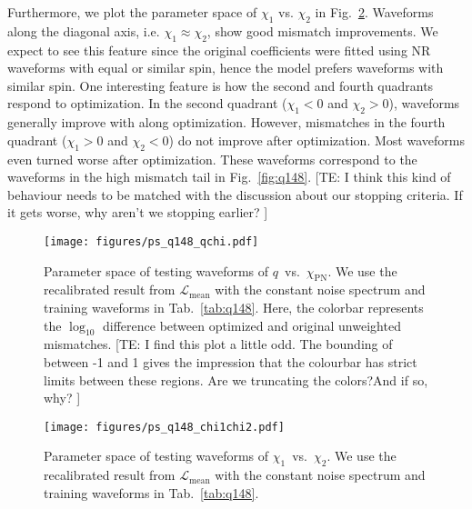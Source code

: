 \documentclass[twocolumn]{aastex631}
\newcommand{\te}[1]{{\color{rr}[TE: #1 ]}}
\begin{document}
Furthermore, we plot the parameter space of $\chi_1$ vs. $\chi_2$ in Fig.~\ref{fig:ps_q148}. Waveforms along the diagonal axis, i.e. $\chi_1\approx\chi_2$, show good mismatch improvements. We expect to see this feature since the original coefficients were fitted using NR waveforms with equal or similar spin, hence the model prefers waveforms with similar spin. One interesting feature is how the second and fourth quadrants respond to optimization. In the second quadrant ($\chi_1<0$ and $\chi_2>0$), waveforms generally improve with along optimization. However, mismatches in the fourth quadrant ($\chi_1>0$ and $\chi_2<0$) do not improve after optimization. Most waveforms even turned worse after optimization. These waveforms correspond to the waveforms in the high mismatch tail in Fig.~\ref{fig:q148}. \te{I think this kind of behaviour needs to be matched with the discussion about our stopping criteria. If it gets worse, why aren't we stopping earlier?}


\begin{figure}[t]
	\centering
	\texttt{[image: figures/ps\_q148\_qchi.pdf]}
	\caption{Parameter space of testing waveforms of $q$~vs.~$\chi_{\mathrm{PN}}$. We use the recalibrated result from $\mathcal{L}_{\mathrm{mean}}$ with the constant noise spectrum and training waveforms in Tab.~\ref{tab:q148}. Here, the colorbar represents the $\log_{10}$ difference between optimized and original unweighted mismatches. \te{I find this plot a little odd. The bounding of between -1 and 1 gives the impression that the colourbar has strict limits between these regions. Are we truncating the colors?And if so, why?}}
	\label{fig:ps_q148_qchi}
\end{figure}
\begin{figure}[t]
	\centering
	\texttt{[image: figures/ps\_q148\_chi1chi2.pdf]}
	\caption{Parameter space of testing waveforms of $\chi_1$~vs.~$\chi_2$. We use the recalibrated result from $\mathcal{L}_{\mathrm{mean}}$ with the constant noise spectrum and training waveforms in Tab.~\ref{tab:q148}.}
	\label{fig:ps_q148}
\end{figure}
\end{document}
